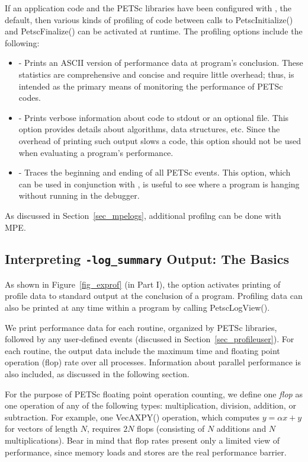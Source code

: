If an application code and the PETSc libraries have been configured with
, the default,
then various kinds of profiling of code between calls to PetscInitialize() and PetscFinalize() can be 
activated at runtime.  The profiling options include the following:
 
\begin{itemize}
\item {} - Prints an ASCII version of performance data
     at program's conclusion. These statistics are comprehensive and concise
     and require little overhead; thus,  is intended as
     the primary means of monitoring the performance of PETSc codes.
\item {} - Prints verbose information about code to
     stdout or an optional file. This option provides details about algorithms,
     data structures, etc. Since the overhead of printing such output slows a
     code, this option should not be used when evaluating a program's performance.
\item {} - Traces the beginning and ending of all
     PETSc events.  This option, which can be used in conjunction with 
     , is useful to see where a program is hanging
     without running in the debugger.  
\end{itemize}
 As discussed in Section~\ref{sec_mpelogs},
additional profilng can be done with MPE.

\subsection{Interpreting {\tt -log\_summary} Output: The Basics}
\label{sec_ploginfo}

As shown in Figure~\ref{fig_exprof} (in Part I), the option 
  activates printing of profile
data to standard output at the conclusion of a program.  Profiling
data can also be printed at any time within a program by calling PetscLogView().

We print performance data for each routine, organized by PETSc
libraries, followed by any user-defined events (discussed in
Section~\ref{sec_profileuser}).  For each routine, the output data
include the maximum time and floating point operation (flop) rate over
all processes.  Information about parallel performance is also
included, as discussed in the following section.

For the purpose of PETSc floating point operation counting, we define
one {\em flop} as one operation of any of the following types:
multiplication, division, addition, or subtraction.  For example, one
VecAXPY() operation, which computes $y = \alpha x + y$ for
vectors of length $N$, requires $2N$ flops (consisting of $N$
additions and $N$ multiplications).  Bear in mind that flop rates
present only a limited view of performance, since memory loads and stores are
the real performance barrier.

